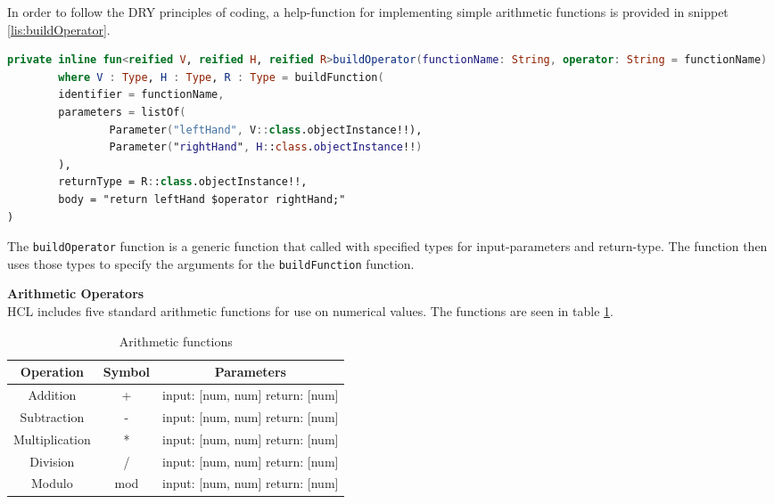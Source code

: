 In order to follow the DRY principles of coding, a help-function for implementing simple arithmetic functions is provided in snippet \ref{lis:buildOperator}.
\begin{lstlisting}[language=Kotlin,label=lis:buildOperator,caption=The implementation of buildOperator.]
private inline fun<reified V, reified H, reified R>buildOperator(functionName: String, operator: String = functionName)
        where V : Type, H : Type, R : Type = buildFunction(
        identifier = functionName,
        parameters = listOf(
                Parameter("leftHand", V::class.objectInstance!!),
                Parameter("rightHand", H::class.objectInstance!!)
        ),
        returnType = R::class.objectInstance!!,
        body = "return leftHand $operator rightHand;"
)
\end{lstlisting}
The \texttt{buildOperator} function is a generic function that called with specified types for input-parameters and return-type. 
The function then uses those types to specify the arguments for the \texttt{buildFunction} function.

\textbf{Arithmetic Operators}\\
HCL includes five standard arithmetic functions for use on numerical values.
The functions are seen in table \ref{tbl-arith}.

\begin{table}[h]
	\centering
	\caption{Arithmetic functions}
	\label{tbl-arith}
	\begin{tabular}{|c|c|c|}
		\hline
		Operation      & Symbol & Parameters                              \\ \hline
		Addition       & +      & input: {[}num, num{]} return: {[}num{]} \\ \hline
		Subtraction    & -      & input: {[}num, num{]} return: {[}num{]} \\ \hline
		Multiplication & *      & input: {[}num, num{]} return: {[}num{]} \\ \hline
		Division       & /      & input: {[}num, num{]} return: {[}num{]} \\ \hline
		Modulo         & mod    & input: {[}num, num{]} return: {[}num{]} \\ \hline
	\end{tabular}
\end{table}
